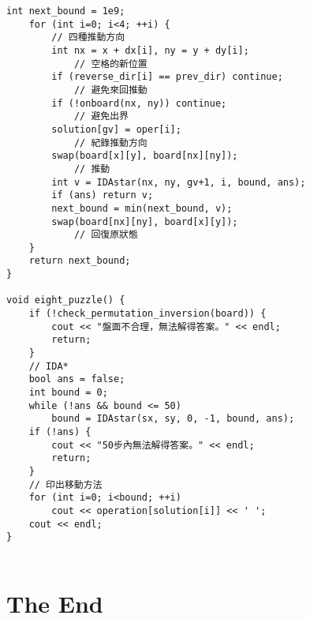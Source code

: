 \documentclass[11pt,twocolumn,a4paper]{article}
\begin{document}
\begin{lstlisting}[label=8 puzzle - IDA*]
	int next_bound = 1e9;
	for (int i=0; i<4; ++i) {
		// 四種推動方向
		int nx = x + dx[i], ny = y + dy[i];
			// 空格的新位置
		if (reverse_dir[i] == prev_dir) continue;
			// 避免來回推動
		if (!onboard(nx, ny)) continue;
			// 避免出界
		solution[gv] = oper[i];
			// 紀錄推動方向
		swap(board[x][y], board[nx][ny]);
			// 推動
		int v = IDAstar(nx, ny, gv+1, i, bound, ans);
		if (ans) return v;
		next_bound = min(next_bound, v);
		swap(board[nx][ny], board[x][y]);
			// 回復原狀態
	}
	return next_bound;
}
 
void eight_puzzle() {
	if (!check_permutation_inversion(board)) {
		cout << "盤面不合理，無法解得答案。" << endl;
		return;
	}
	// IDA*
	bool ans = false;
	int bound = 0;
	while (!ans && bound <= 50)
		bound = IDAstar(sx, sy, 0, -1, bound, ans);
	if (!ans) {
		cout << "50步內無法解得答案。" << endl;
		return;
	}
	// 印出移動方法
	for (int i=0; i<bound; ++i)
		cout << operation[solution[i]] << ' ';
	cout << endl;
}
 

\end{lstlisting}

\section*{The End}
\end{document}
